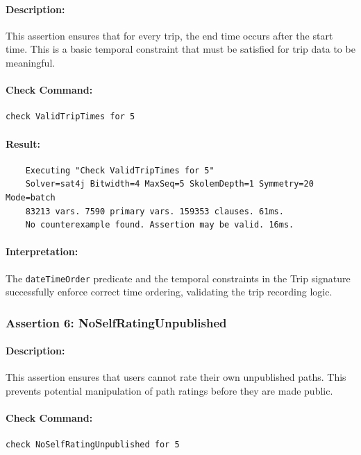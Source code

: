\paragraph{Description:} This assertion ensures that for every trip, the end time occurs after the start time. This is a basic temporal constraint that must be satisfied for trip data to be meaningful.

\paragraph{Check Command:}
\begin{verbatim}
check ValidTripTimes for 5
\end{verbatim}

\paragraph{Result:} 
\footnotesize
\begin{verbatim}
    Executing "Check ValidTripTimes for 5"
    Solver=sat4j Bitwidth=4 MaxSeq=5 SkolemDepth=1 Symmetry=20 Mode=batch
    83213 vars. 7590 primary vars. 159353 clauses. 61ms.
    No counterexample found. Assertion may be valid. 16ms.
\end{verbatim}
\normalsize

\paragraph{Interpretation:} The \texttt{dateTimeOrder} predicate and the temporal constraints in the Trip signature successfully enforce correct time ordering, validating the trip recording logic.

\subsubsection{Assertion 6: NoSelfRatingUnpublished}
\paragraph{Description:} This assertion ensures that users cannot rate their own unpublished paths. This prevents potential manipulation of path ratings before they are made public.

\paragraph{Check Command:}
\begin{verbatim}
check NoSelfRatingUnpublished for 5
\end{verbatim}

